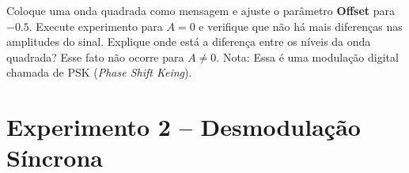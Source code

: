 \documentclass[12pt,addpoints]{exam}
\begin{document}
\begin{questions}

    
    
    \question Coloque uma onda quadrada como mensagem e ajuste o parâmetro \textbf{Offset} para $-0.5$. Execute experimento para $A = 0$ e verifique que não há mais diferenças nas amplitudes do sinal. Explique onde está a diferença entre os níveis da onda quadrada? Esse fato não ocorre para $A \ne 0$. Nota: Essa é uma modulação digital chamada de PSK ({\it Phase Shift Keing}).
   \fillwithlines{0.5in}
    
 

\end{questions}

\section*{Experimento 2 -- Desmodulação Síncrona}
\end{document}

